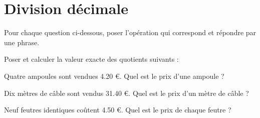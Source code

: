 \section{Division décimale}

Pour chaque question ci-dessous, poser l'opération qui correspond et répondre par une phrase.

\begin{questions}
	\question Poser et calculer la valeur exacte des quotients suivants :
	
	\begin{parts}
	\end{parts} 
	
	 Quatre ampoules sont vendues \num{4.20} €. Quel est le prix d'une ampoule ?
	
	\question Dix mètres de câble sont vendus \num{31.40} €. Quel est le prix d'un mètre de câble ?
	
	\question Neuf feutres identiques coûtent \num{4.50} €. Quel est le prix de chaque feutre ?
	
	
\end{questions}